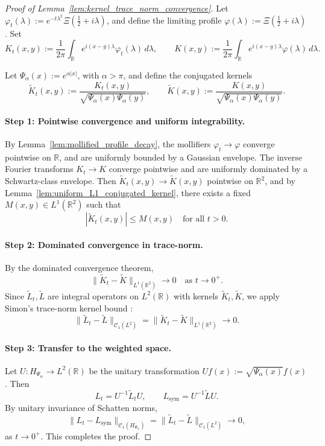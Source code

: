 \begin{proof}[Proof of Lemma~\ref{lem:kernel_trace_norm_convergence}]
Let \( \varphi_t(\lambda) := e^{-t\lambda^2} \Xi\left(\tfrac{1}{2} + i\lambda\right) \), and define the limiting profile \( \varphi(\lambda) := \Xi\left(\tfrac{1}{2} + i\lambda\right) \). Set
\[
K_t(x,y) := \frac{1}{2\pi} \int_{\mathbb{R}} e^{i(x - y)\lambda} \varphi_t(\lambda)\, d\lambda, \qquad
K(x,y) := \frac{1}{2\pi} \int_{\mathbb{R}} e^{i(x - y)\lambda} \varphi(\lambda)\, d\lambda.
\]

Let \( \Psi_\alpha(x) := e^{\alpha |x|} \), with \( \alpha > \pi \), and define the conjugated kernels
\[
\widetilde{K}_t(x,y) := \frac{K_t(x,y)}{\sqrt{\Psi_\alpha(x)\Psi_\alpha(y)}}, \qquad
\widetilde{K}(x,y) := \frac{K(x,y)}{\sqrt{\Psi_\alpha(x)\Psi_\alpha(y)}}.
\]

\paragraph{Step 1: Pointwise convergence and uniform integrability.}
By Lemma~\ref{lem:mollified_profile_decay}, the mollifiers \( \varphi_t \to \varphi \) converge pointwise on \( \mathbb{R} \), and are uniformly bounded by a Gaussian envelope. The inverse Fourier transforms \( K_t \to K \) converge pointwise and are uniformly dominated by a Schwartz-class envelope. Then \( \widetilde{K}_t(x,y) \to \widetilde{K}(x,y) \) pointwise on \( \mathbb{R}^2 \), and by Lemma~\ref{lem:uniform_L1_conjugated_kernel}, there exists a fixed \( M(x,y) \in L^1(\mathbb{R}^2) \) such that
\[
|\widetilde{K}_t(x,y)| \le M(x,y) \quad \text{for all } t > 0.
\]

\paragraph{Step 2: Dominated convergence in trace-norm.}
By the dominated convergence theorem,
\[
\| \widetilde{K}_t - \widetilde{K} \|_{L^1(\mathbb{R}^2)} \to 0 \quad \text{as } t \to 0^+.
\]
Since \( \widetilde{L}_t, \widetilde{L} \) are integral operators on \( L^2(\mathbb{R}) \) with kernels \( \widetilde{K}_t, \widetilde{K} \), we apply Simon’s trace-norm kernel bound \cite[Theorem~3.1]{Simon2005TraceIdeals}:
\[
\| \widetilde{L}_t - \widetilde{L} \|_{\mathcal{C}_1(L^2)} = \| \widetilde{K}_t - \widetilde{K} \|_{L^1(\mathbb{R}^2)} \to 0.
\]

\paragraph{Step 3: Transfer to the weighted space.}
Let \( U \colon H_{\Psi_\alpha} \to L^2(\mathbb{R}) \) be the unitary transformation \( Uf(x) := \sqrt{\Psi_\alpha(x)} f(x) \). Then
\[
L_t = U^{-1} \widetilde{L}_t U, \qquad L_{\mathrm{sym}} = U^{-1} \widetilde{L} U.
\]
By unitary invariance of Schatten norms,
\[
\| L_t - L_{\mathrm{sym}} \|_{\mathcal{C}_1(H_{\Psi_\alpha})} = \| \widetilde{L}_t - \widetilde{L} \|_{\mathcal{C}_1(L^2)} \to 0,
\]
as \( t \to 0^+ \). This completes the proof.
\end{proof}
%  